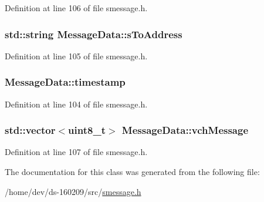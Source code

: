 Definition at line 106 of file smessage.\+h.

\hypertarget{class_message_data_aada42ee21e633c6ac8031800942b0dff}{}
\subsubsection[{s\+To\+Address}]{\setlength{\rightskip}{0pt plus 5cm}std\+::string Message\+Data\+::s\+To\+Address}\label{class_message_data_aada42ee21e633c6ac8031800942b0dff}


Definition at line 105 of file smessage.\+h.

\hypertarget{class_message_data_ab5afd561eaa6bc5f64a6c63de9b09f9d}{}
\subsubsection[{timestamp}]{ Message\+Data\+::timestamp}\label{class_message_data_ab5afd561eaa6bc5f64a6c63de9b09f9d}


Definition at line 104 of file smessage.\+h.

\hypertarget{class_message_data_a0a0a69a68866ee4810571e0e4dd05242}{}
\subsubsection[{vch\+Message}]{\setlength{\rightskip}{0pt plus 5cm}std\+::vector$<${\bf uint8\+\_\+t}$>$ Message\+Data\+::vch\+Message}\label{class_message_data_a0a0a69a68866ee4810571e0e4dd05242}


Definition at line 107 of file smessage.\+h.



The documentation for this class was generated from the following file\+:\begin{DoxyCompactItemize}
\item 
/home/dev/ds-\/160209/src/\hyperlink{smessage_8h}{smessage.\+h}\end{DoxyCompactItemize}
